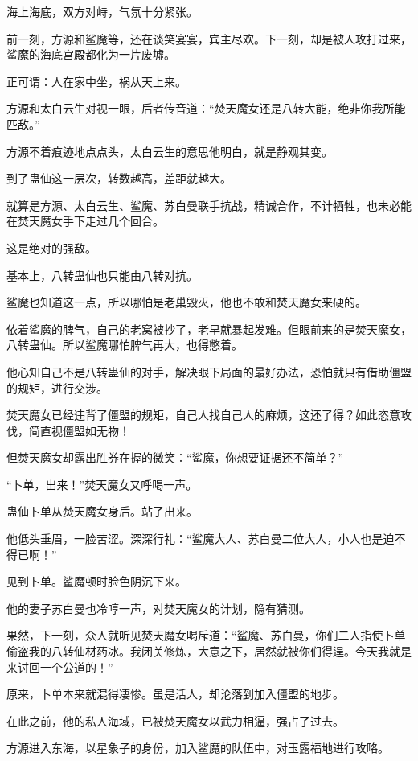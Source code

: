 
\begin{this_body}

海上海底，双方对峙，气氛十分紧张。

前一刻，方源和鲨魔等，还在谈笑宴宴，宾主尽欢。下一刻，却是被人攻打过来，鲨魔的海底宫殿都化为一片废墟。

正可谓：人在家中坐，祸从天上来。

方源和太白云生对视一眼，后者传音道：“焚天魔女还是八转大能，绝非你我所能匹敌。”

方源不着痕迹地点点头，太白云生的意思他明白，就是静观其变。

到了蛊仙这一层次，转数越高，差距就越大。

就算是方源、太白云生、鲨魔、苏白曼联手抗战，精诚合作，不计牺牲，也未必能在焚天魔女手下走过几个回合。

这是绝对的强敌。

基本上，八转蛊仙也只能由八转对抗。

鲨魔也知道这一点，所以哪怕是老巢毁灭，他也不敢和焚天魔女来硬的。

依着鲨魔的脾气，自己的老窝被抄了，老早就暴起发难。但眼前来的是焚天魔女，八转蛊仙。所以鲨魔哪怕脾气再大，也得憋着。

他心知自己不是八转蛊仙的对手，解决眼下局面的最好办法，恐怕就只有借助僵盟的规矩，进行交涉。

焚天魔女已经违背了僵盟的规矩，自己人找自己人的麻烦，这还了得？如此恣意攻伐，简直视僵盟如无物！

但焚天魔女却露出胜券在握的微笑：“鲨魔，你想要证据还不简单？”

“卜单，出来！”焚天魔女又呼喝一声。

蛊仙卜单从焚天魔女身后。站了出来。

他低头垂眉，一脸苦涩。深深行礼：“鲨魔大人、苏白曼二位大人，小人也是迫不得已啊！”

见到卜单。鲨魔顿时脸色阴沉下来。

他的妻子苏白曼也冷哼一声，对焚天魔女的计划，隐有猜测。

果然，下一刻，众人就听见焚天魔女喝斥道：“鲨魔、苏白曼，你们二人指使卜单偷盗我的八转仙材药冰。我闭关修炼，大意之下，居然就被你们得逞。今天我就是来讨回一个公道的！”

原来，卜单本来就混得凄惨。虽是活人，却沦落到加入僵盟的地步。

在此之前，他的私人海域，已被焚天魔女以武力相逼，强占了过去。

方源进入东海，以星象子的身份，加入鲨魔的队伍中，对玉露福地进行攻略。


\end{this_body}
